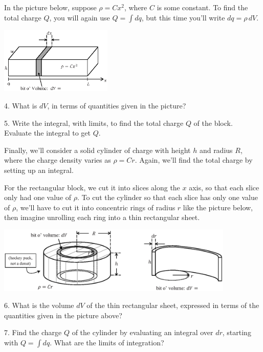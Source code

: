 \newpage

In the picture below, suppose $\rho = Cx^2$, where $C$ is some constant. To find the total charge $Q$, you will again use $Q = \int dq$, but this time you'll write $dq = \rho \,dV$.  
\vspace{-0.2 in}
\begin{center}
\includegraphics[width=0.40\textwidth]{charge_density/fig4.eps}
\end{center}

4.  What is $dV$, in terms of quantities given in the picture?
\vspace{0.3in}

5.  Write the integral, with limits, to find the total charge $Q$ of the block.  Evaluate the integral to get $Q$.
\vspace{1.0in}

Finally, we'll consider a solid cylinder of charge with height $h$ and radius $R$, where the charge density varies as $\rho = Cr$.  Again, we'll find the total charge by setting up an integral. 

For the rectangular block, we cut it into slices along the $x$ axis, so that each slice only had one value of $\rho$.  To cut the cylinder so that each slice has only one value of $\rho$, we'll have to cut it into concentric rings of radius $r$ like the picture below, then imagine unrolling each ring into a thin rectangular sheet.

\begin{center}
\includegraphics[width=0.85\textwidth]{charge_density/cylinders.eps}
\end{center}

6. What is the volume $dV$ of the thin rectangular sheet, expressed in terms of the quantities given in the picture above?
\vspace{0.3in}

7. Find the charge $Q$ of the cylinder by evaluating an integral over $dr$, starting with $Q = \int dq$.  What are the limits of integration? 




